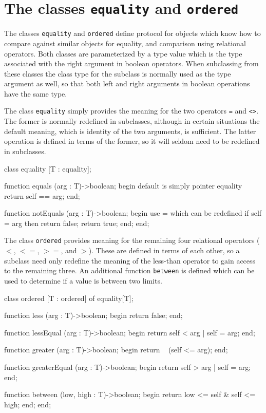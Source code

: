 \section{The classes {\tt equality} and {\tt ordered}}

The classes {\tt equality} and {\tt ordered} define protocol for
objects which know how to compare against similar objects for equality,
and comparison using relational operators.   Both classes are parameterized by
a type value which is the type associated with the
right argument in boolean operators.
When subclassing from these classes the class type for the subclass
is normally used as the type argument as well, so that both left
and right arguments in boolean operations have the same type.

The class {\tt equality} simply
provides the meaning for the two operators \verb+=+ and \verb+<>+.
The former is normally redefined in subclasses, although in certain
situations the default meaning, which is identity of the two arguments,
is sufficient.  The latter operation is defined in terms of the former,
so it will seldom need to be redefined in subclasses.

\begin{cprog}

class equality [T : equality];

	function equals (arg : T)->boolean;
	begin
			{  default is simply pointer equality }
		return self == arg;
	end;

	function notEquals (arg : T)->boolean;
	begin
			{ use = which can be redefined }
		if self = arg then
			return false;
		return true;
	end;
end;

\end{cprog}

The class {\tt ordered} provides meaning for the remaining four
relational operators ($<$, $<=$, $>=$, and $>$).
These are defined in terms of each other, so a subclass need only
redefine the meaning of the less-than operator to gain access to the
remaining three.  An additional function {\tt between} is defined which
can be used to determine if a value is between two limits.

\begin{cprog}

class ordered [T : ordered] of equality[T];

	function less (arg : T)->boolean;
	begin
		return false;
	end;

	function lessEqual (arg : T)->boolean;
	begin
		return self < arg | self = arg;
	end;

	function greater (arg : T)->boolean;
	begin
		return ~ (self <= arg);
	end;

	function greaterEqual (arg : T)->boolean;
	begin
		return self > arg | self = arg;
	end;

	function between (low, high : T)->boolean;
	begin
		return low <= self & self <= high;
	end;
end;

\end{cprog}

